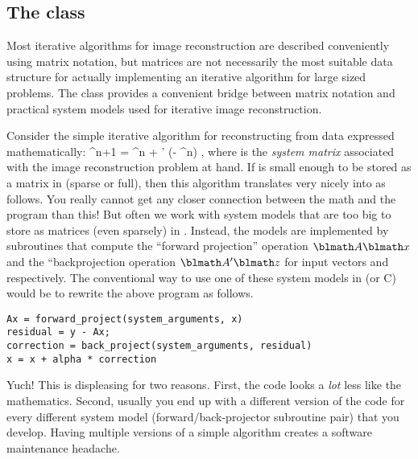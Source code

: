 

\subsection{The \fatrixx class}

Most iterative algorithms
for image reconstruction
are described conveniently using matrix notation,
but matrices are not necessarily
the most suitable data structure
for actually implementing an iterative algorithm
for large sized problems.
The \fatrixx class
provides a convenient bridge
between matrix notation
and practical system models
used for iterative image reconstruction.

Consider the simple iterative algorithm
for reconstructing \x from data \y
expressed mathematically:
\be
\x^{n+1} = \x^n + \alpha \A' (\y - \A\x^n)
,
where \A is the \emph{system matrix}
associated with
the image reconstruction problem at hand.
%
If \A is small enough
to be stored as a matrix in \matlab
(sparse or full),
then this algorithm translates
very nicely into \matlab as follows.
\be
{}
You really cannot get any closer connection
between the math and the program than this!
But often we work
with system models
that are too big to store
as matrices (even sparsely) in \matlab.
Instead,
the models
are implemented by subroutines
that compute the ``forward projection'' operation
$\A \x$
and the ``backprojection operation
$\A' \z$
for input vectors \x and \z respectively.
%
The conventional way
to use one of these system models
in \matlab (or C) would be to rewrite
the above program as follows.
\begin{verbatim}
Ax = forward_project(system_arguments, x)
residual = y - Ax;
correction = back_project(system_arguments, residual)
x = x + alpha * correction
\end{verbatim}
Yuch!
This is displeasing for two reasons.
First,
the code looks a \emph{lot} less like the mathematics.
Second,
usually you end up with a different version of the code
for every different system model
(forward/back-projector subroutine pair)
that you develop.
Having multiple versions
of a simple algorithm
creates a software maintenance headache.


